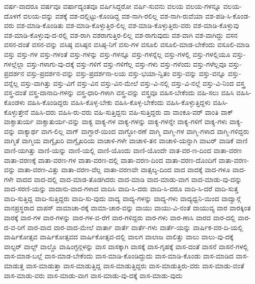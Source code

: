 {ವರ್ಷ-ವಾದರೂ
ವರ್ಷವೂ
ವರ್ಷಾದ್ಯಂತವೂ
ವರ್ಷಿಸಿದ್ದರೋ
ವರ್ಷಿ-ಸುವನು
ವಲಯ
ವಲಯ-ಗಳನ್ನೂ
ವಲಯ-ದೊಳಗೆ
ವಲಯ-ವನ್ನು
ವಶಕ್ಕೆ
ವಶ-ದಲ್ಲಿಟ್ಟು-ಕೊಂಡಿದ್ದ
ವಶ-ನಾಗಿ-ರಲಿಲ್ಲ
ವಶ-ನಾಗಿ-ರುವೆಯಾ
ವಶ-ಪಡಿ-ಸಿ-ಕೊಂಡ-ವರು
ವಶ-ಮಾಡಿ-ಕೊಂಡಿತು
ವಶ-ಮಾಡಿ-ಕೊಳ್ಳುತ್ತಿರ-ಲಿಲ್ಲ
ವಶ-ಮಾಡಿ-ಕೊಳ್ಳುತ್ತಿರು-ವರು
ವಶ-ಮಾಡಿ-ಕೊಳ್ಳುವು
ವಶ-ಮಾಡಿ-ಕೊಳ್ಳುವು-ದ-ರಲ್ಲಿ
ವಶ-ರಾಗಿ
ವಶರಾಗುತ್ತಿರ-ಲಿಲ್ಲ
ವಶ-ರಾಗುವುದು
ವಶ-ವಾಗಿ
ವಶ-ವಾಗಿದ್ದು
ವಸನ
ವಸನ-ದಂತೆ
ವಸನ-ವನ್ನು
ವಸಿಷ್ಠ
ವಸಿಷ್ಠನ
ವಸಿಷ್ಠ-ನಿಗೆ
ವಸು-ಗಳ
ವಸೂಲಿ
ವಸೂಲಿ-ಮಾಡ-ಬೇಕೆಂದು
ವಸೂಲಿ-ಮಾಡಿ
ವಸ್ತು
ವಸ್ತು-ಗಳ
ವಸ್ತು-ಗಳಂತೆ
ವಸ್ತು-ಗಳನ್ನು
ವಸ್ತು-ಗಳನ್ನೂ
ವಸ್ತು-ಗಳನ್ನೆಲ್ಲ
ವಸ್ತು-ಗಳಲ್ಲಿ
ವಸ್ತು-ಗಳಲ್ಲಿಯೂ
ವಸ್ತು-ಗಳಲ್ಲೆಲ್ಲಾ
ವಸ್ತು-ಗಳಾಗು-ವು-ದಕ್ಕೆ
ವಸ್ತು-ಗಳಿಗೆ
ವಸ್ತು-ಗಳಿಗೆಲ್ಲ
ವಸ್ತು-ಗಳು
ವಸ್ತು-ಗಳೆಂದು
ವಸ್ತು-ಗಳೆಲ್ಲವೂ
ವಸ್ತು-ಪ್ರದರ್ಶನ
ವಸ್ತು-ಪ್ರದರ್ಶನ-ವನ್ನು
ವಸ್ತು-ಪ್ರದರ್ಶನಾ-ಲಯ
ವಸ್ತು-ಭಯಾ-ನ್ವಿತಂ
ವಸ್ತು-ವನ್ನು
ವಸ್ತು-ವನ್ನೂ
ವಸ್ತು-ವನ್ನೆಲ್ಲ
ವಸ್ತು-ವಾಗಿತ್ತು
ವಸ್ತು-ವಿಗೆ
ವಸ್ತು-ವಿನ
ವಸ್ತು-ವಿನ-ಮೇಲೆ
ವಸ್ತು-ವಿ-ನಲ್ಲಿ
ವಸ್ತು-ವಿ-ನಲ್ಲೆ
ವಸ್ತು-ವಿ-ನಿಂದ
ವಸ್ತ್ರ
ವಸ್ತ್ರ-ದಂತೆ
ವಸ್ತ್ರ-ದಾನಾದಿ-ಗಳನ್ನು
ವಸ್ತ್ರ-ಧಾರಿ-ಗಳಾಗಿ
ವಸ್ತ್ರ-ವನ್ನು
ವಸ್ತ್ರವೂ
ವಹಿಸ-ಬೇಕೆಂದು
ವಹಿ-ಸಲು
ವಹಿಸಿ
ವಹಿಸಿ-ಕೊಂಡಳು
ವಹಿಸಿ-ಕೊಂಡಿದ್ದರು
ವಹಿಸಿ-ಕೊಳ್ಳ-ಬೇಕು
ವಹಿಸಿ-ಕೊಳ್ಳ-ಬೇಕೆಂದು
ವಹಿಸಿ-ಕೊಳ್ಳುತ್ತಿದ್ದಳು
ವಹಿಸಿ-ಕೊಳ್ಳುತ್ತೇನೆ
ವಹಿಸಿ-ದರು
ವಹಿಸಿ-ರು-ವರು
ವಹಿ-ಸುತ್ತಿದ್ದನು
ವಹಿ-ಸುತ್ತಿದ್ದರು
ವಾ
ವಾಂಕೂ-ವರ್
ವಾಂತಿ
ವಾಕ್
ವಾಕ್ಚಾತುರ್ಯ
ವಾಕ್ಚಾತುರ್ಯ-ವನ್ನು
ವಾಕ್ಯ
ವಾಕ್ಯ-ಗಳ
ವಾಕ್ಯ-ಗಳನ್ನು
ವಾಕ್ಯ-ಗಳನ್ನೇ
ವಾಕ್ಯ-ಗಳಿಗೆ
ವಾಕ್ಯ-ಗಳು
ವಾಕ್ಯ-ವನ್ನು
ವಾಕ್ಯಾರ್ಥ
ವಾಗ-ಲಿಲ್ಲ
ವಾಗ್
ವಾಗ್ಧಾರೆ-ಯಿಂದ
ವಾಗ್ಧೋ-ರಣೆ
ವಾಗ್ಮಿ
ವಾಗ್ಮಿ-ಗಳ
ವಾಗ್ಮಿ-ಗಳಾದ
ವಾಗ್ಮಿ-ಗಳಿದ್ದರು
ವಾಗ್ಮಿತೆ
ವಾಗ್ಮಿಯ
ವಾಗ್ವೈಖರಿ
ವಾಗ್ವೈಖರಿಯ
ವಾಚಾಳಿ-ಗಳೇ
ವಾಚಾಳಿ-ತನ
ವಾಚಾಳಿ-ಯನ್ನಾಗಿ
ವಾಟರ್
ವಾಡಿಕೆ
ವಾಣಿ
ವಾಣಿ-ಯಗಿತ್ತು
ವಾಣಿ-ಯನ್ನು
ವಾಣಿ-ಯಲ್ಲಿ
ವಾಣಿ-ಯೊಂದು
ವಾಣಿ-ಯೊಂದೇ
ವಾತ-ವರ-ಣ-ದಿಂದ
ವಾತಾ-ವರಣ
ವಾತಾ-ವರಣಕ್ಕೆ
ವಾತಾ-ವರಣ-ಗಳ
ವಾತಾ-ವರಣ-ದಲ್ಲಿ
ವಾತಾ-ವರಣ-ದಿಂದ
ವಾತಾ-ವರಣ-ದೊಂದಿಗೆ
ವಾತಾ-ವರಣ-ವನ್ನು
ವಾತಾ-ವರಣ-ವಿತ್ತು
ವಾತಾ-ವರಣ-ವೆಲ್ಲ
ವಾತಾ-ವರಣವೇ
ವಾತ್ಸಲ್ಯ-ದಿಂದ
ವಾದ
ವಾದಕ್ಕೆ
ವಾದ-ಗಳೂ
ವಾದ-ಗಳೇ
ವಾದದ
ವಾದ-ದಲ್ಲಿ
ವಾದ-ಮಾಡ-ತೊಡಗಿದರು
ವಾದ-ಮಾಡಿ
ವಾದ-ಮಾಡು-ವಾಗ
ವಾದ-ಮಾಡು-ವು-ದನ್ನು
ವಾದ-ಸರಣಿ-ಯನ್ನು
ವಾದಾನು-ವಾದ-ಗಳಾದ
ವಾದಿಸಿ
ವಾದಿ-ಸಿ-ದರು
ವಾದಿ-ಸಿ-ದರೂ
ವಾದಿ-ಸಿ-ದರೆ
ವಾದಿ-ಸುತ್ತ
ವಾದಿ-ಸುತ್ತಿದ್ದ
ವಾದಿ-ಸುತ್ತಿದ್ದರು
ವಾದಿ-ಸು-ವುದು
ವಾದ್ಯ
ವಾದ್ಯ-ಗಳನ್ನು
ವಾದ್ಯ-ಗಳು
ವಾದ್ಯಧ್ವನಿ-ಯಿಂದ
ವಾದ್ವಾನ್ಗೆ
ವಾನಪ್ರಸ್ಥರಾದ
ವಾಪಸ್
ವಾಮಾಚಾ-ರಕ್ಕೆ
ವಾಮಾ-ಚಾರ-ವನ್ನು
ವಾಯು
ವಾಯು-ವಿ-ನಂತೆ
ವಾಯುವ್ಯ
ವಾರ
ವಾರಕ್ಕಿಂತ
ವಾರಕ್ಕೆ
ವಾರ-ಗಳ
ವಾರ-ಗಳನ್ನು
ವಾರ-ಗಳ-ವ-ರೆಗೆ
ವಾರ-ಗಳಿದ್ದರು
ವಾರ-ಗಳು
ವಾರ-ಣಾಸಿ
ವಾರದ
ವಾರ-ದಲ್ಲಿ
ವಾರ-ದ-ವ-ರಿಗೆ
ವಾರ-ವಾದ
ವಾರ-ವಾದ-ಮೇಲೆ
ವಾರ್ತಾ
ವಾರ್ತೆ
ವಾರ್ತೆ-ಗಳು
ವಾರ್ತೆ-ಯನ್ನು
ವಾರ್ಷಿಕ-ವರ-ದಿ-ಯಲ್ಲಿ
ವಾರ್ಷಿಕೋತ್ಸವ
ವಾರ್ಷಿಕೋತ್ಸವದ
ವಾರ್ಷಿಕೋತ್ಸವ-ದಲ್ಲಿ
ವಾಲಗ
ವಾಲಾಜ
ವಾಲಿತ್ತು
ವಾಲು
ವಾಲು-ವು-ದಕ್ಕೆ
ವಾಲ್ಟರ್
ವಾಲ್ಟ್
ವಾಲ್ಡೊ
ವಾಷಿಂಗ್ಟನ್ಗಳನ್ನು
ವಾಸ
ವಾಸಕ್ಕಾಗಿ
ವಾಸಕ್ಕೆ
ವಾಸ-ಗೃಹಕ್ಕೆ
ವಾಸ-ದಂತೆ
ವಾಸನೆ
ವಾಸನೆ-ಗಳಲ್ಲಿ
ವಾಸ-ಮಾಡ-ಬಲ್ಲೆ
ವಾಸ-ಮಾಡ-ಬೇಕೆಂದು
ವಾಸ-ಮಾಡಿ-ಕೊಂಡಿದ್ದುದು
ವಾಸ-ಮಾಡಿ-ಕೊಂಡು
ವಾಸ-ಮಾಡಿದ
ವಾಸ-ಮಾಡುತ್ತ
ವಾಸ-ಮಾಡುತ್ತಾ
ವಾಸ-ಮಾಡುತ್ತಿದ್ದ
ವಾಸ-ಮಾಡುತ್ತಿದ್ದರು
ವಾಸ-ಮಾಡುತ್ತಿರು-ವರು
ವಾಸ-ಮಾಡು-ವಂತೆ
ವಾಸ-ಮಾಡು-ವರು
ವಾಸ-ಮಾಡು-ವಾಗ
ವಾಸ-ಮಾಡು-ವು-ದಕ್ಕೆ
ವಾಸ-ಮಾಡು-ವುದು
}
